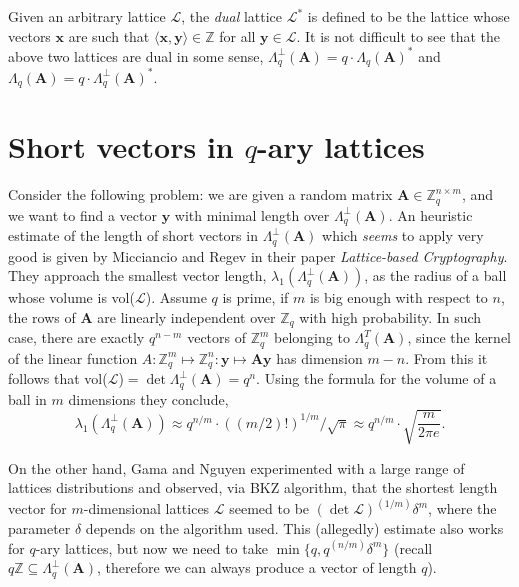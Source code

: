 \documentclass[11pt]{article}
\begin{document}
Given an arbitrary lattice $ \mathcal{L}$, the \emph{dual} lattice $\mathcal{L}^*$ is defined to be the lattice whose vectors $\boldsymbol{x}$ are such that $\langle \boldsymbol{x},\boldsymbol{y} \rangle \in \mathbb{Z}$ for all $\boldsymbol{y} \in \mathcal{L}$. It is not difficult to see that the above two lattices are dual in some sense, $\Lambda_q^{\bot} ( \boldsymbol{A} ) = q \cdot \Lambda_q (\boldsymbol{A} ) ^*$ and $\Lambda_q ( \boldsymbol{A} ) = q \cdot \Lambda_q^{\bot} ( \boldsymbol{A} )^*$.

\section*{Short vectors in $q$-ary lattices}
Consider the following problem: we are given a random matrix $\boldsymbol{A} \in \mathbb{Z}_q^{n \times m}$, and we want to find a vector $\boldsymbol{y}$ with minimal length over $\Lambda_q^{\bot}(\boldsymbol{A})$. An heuristic estimate of the length of short vectors in $\Lambda_q^{\bot}(\boldsymbol{A})$ which  \emph{seems} to apply very good is given by Micciancio and Regev in their paper \emph{Lattice-based Cryptography}. They approach the smallest vector length, $\lambda_1(\Lambda_q^{\bot} (\boldsymbol{A}))$, as the radius of a ball whose volume is vol($\mathcal{L}$). Assume $q$ is prime, if $m$ is big enough with respect to $n$, the rows of $\boldsymbol{A}$ are linearly independent over $\mathbb{Z}_q$ with high probability. In such case, there are exactly $q^{n-m}$ vectors of $\mathbb{Z}_q^m$ belonging to $\Lambda_q^T ( \boldsymbol{A} )$, since the kernel of the linear function $A: \mathbb{Z}_q^m \mapsto \mathbb{Z}_q^n: \boldsymbol{y} \mapsto \boldsymbol{Ay}$ has dimension $m-n$. From this it follows that vol($\mathcal{L}$)$ = \det{\Lambda_q^{\bot}(\boldsymbol{A})} = q^n$. Using the formula for the volume of a ball in $m$ dimensions they conclude,
\begin{equation*}
 \lambda_1(\Lambda_q^{\bot}(\boldsymbol{A})) \approx q^{n/m}\cdot((m/2)!)^{1/m}/\sqrt{\pi} \approx q^{n/m}\cdot \sqrt{\frac{m}{2 \pi e}}.
\end{equation*}

On the other hand, Gama and Nguyen experimented with a large range of lattices distributions and observed, via BKZ algorithm, that  the shortest length vector for $m$-dimensional lattices $\mathcal{L}$ seemed to be $(\det{\mathcal{L}})^{(1/m)} \delta^m$, where the parameter $\delta$ depends on the algorithm used. This (allegedly) estimate also works for $q$-ary lattices, but now we need to take $\min \{q,q^{(n/m)} \delta^m\}$  (recall $q \mathbb{Z} \subseteq \Lambda_q^{\bot}(\boldsymbol{A})$, therefore we can always produce a vector of length $q$).
\end{document}
